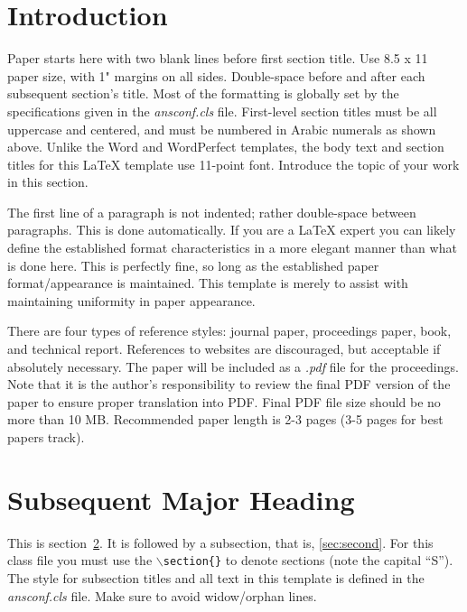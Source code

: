 \documentclass{ansconf}
\begin{document}
\begin{multicols}{2}

\section{Introduction}

Paper starts here with two blank lines before first section title.  Use 
8.5 x 11 paper size, with 1" margins on all sides.  Double-space before and
after each subsequent section's title.  Most of the formatting is globally
set by the specifications given in the {\it ansconf.cls} file.  
First-level section titles must be all uppercase and centered, and must 
be numbered in Arabic numerals as shown above.  Unlike the Word and WordPerfect
templates, the body text and section titles for this {\LaTeX} template use 
11-point font.  Introduce the topic of 
your work in this section.

The first line of a paragraph is not indented; rather double-space between 
paragraphs.  This is done automatically. If you are a {\LaTeX} expert you 
can likely define the established format characteristics in a more elegant 
manner than what is done here.  This is perfectly fine, so long as the 
established paper format/appearance is maintained.  This template is merely 
to assist with maintaining uniformity in paper appearance.

There are four types of reference styles: journal paper\cite{journal},
proceedings paper\cite{proc_paper}, book\cite{book}, and technical report\cite{techrep}.
References to websites are discouraged, but acceptable if absolutely necessary.
The paper will be included as a {\it .pdf} file for the proceedings. Note that
it is the author's responsibility to review the final PDF version of the paper
to ensure proper translation into PDF.  Final PDF file size should be no more
than 10 MB. Recommended paper length is 2-3 pages (3-5 pages for best papers track).

\section{Subsequent Major Heading}
\label{sec:first}

This is section~\ref{sec:first}. It is followed by a subsection, that is, 
\ref{sec:second}. For this class file you must use the 
\texttt{$\backslash$section\{\}} to denote sections (note the capital ``S'').  
The style for subsection titles and all text in this template is defined in 
the {\it ansconf.cls} file.  Make sure to avoid widow/orphan lines.



\end{multicols}
\end{document}
